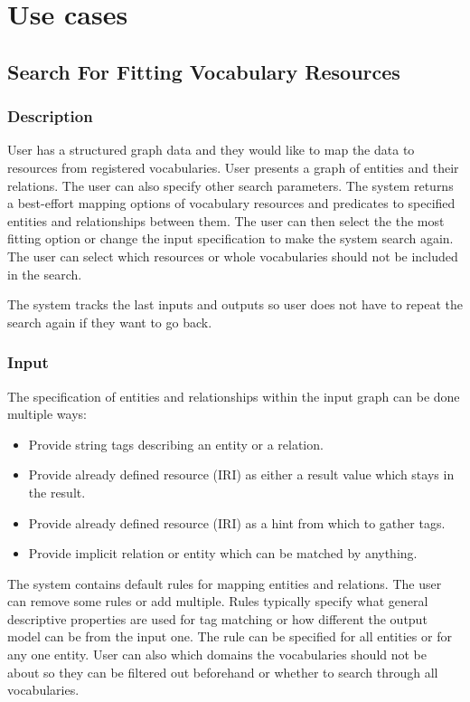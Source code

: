 \chapter{Use cases}

\section{Search For Fitting Vocabulary Resources}

\subsection{Description}
User has a structured graph data and they would like to map the data to resources from registered vocabularies. User presents a graph of entities and their relations. The user can also specify other search parameters. The system returns a best-effort mapping options of vocabulary resources and predicates to specified entities and relationships between them. The user can then select the the most fitting option or change the input specification to make the system search again. The user can select which resources or whole vocabularies should not be included in the search.

The system tracks the last inputs and outputs so user does not have to repeat the search again if they want to go back. 


\subsection{Input}
The specification of entities and relationships within the input graph can be done multiple ways:
\begin{itemize}
    \item Provide string tags describing an entity or a relation.
    \item Provide already defined resource (IRI) as either a result value which stays in the result.
    \item Provide already defined resource (IRI) as a hint from which to gather tags.
    \item Provide implicit relation or entity which can be matched by anything.
\end{itemize}

The system contains default rules for mapping entities and relations. The user can remove some rules or add multiple. Rules typically specify what general descriptive properties are used for tag matching or how different the output model can be from the input one. The rule can be specified for all entities or for any one entity. User can also which domains the vocabularies should not be about so they can be filtered out beforehand or whether to search through all vocabularies.

